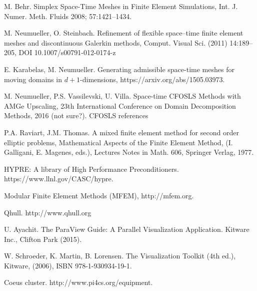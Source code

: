 \documentclass[12pt]{article}
\begin{document}

%


\begin{thebibliography}{100}

M. Behr. Simplex Space-Time Meshes in Finite Element Simulations,
Int. J. Numer. Meth. Fluids 2008; 57:1421–1434.

M. Neumueller, O. Steinbach. Refinement of flexible space–time finite element meshes and discontinuous Galerkin methods, Comput. Visual Sci. (2011) 14:189–205, DOI 10.1007/s00791-012-0174-z

E. Karabelas, M. Neumueller. Generating admissible space-time meshes for moving domains in $d + 1$-dimensions, https://arxiv.org/abs/1505.03973.

M. Neumueller, P.S. Vassilevski, U. Villa. Space-time CFOSLS Methods with AMGe Upscaling, 23th International Conference on Domain Decomposition Methods, 2016 (not sure?).
CFOSLS references

P.A. Raviart, J.M. Thomas. A mixed finite element method for second order elliptic problems, Mathematical Aspects of the Finite Element Method, (I. Galligani, E. Magenes, eds.), Lectures Notes in
Math. 606, Springer Verlag, 1977.

HYPRE: A library of High Performance Preconditioners. https://www.llnl.gov/CASC/hypre.

Modular Finite Element Methods (MFEM), http://mfem.org.

Qhull. http://www.qhull.org

U. Ayachit. The ParaView Guide: A Parallel Visualization Application. Kitware Inc., Clifton Park (2015).

W. Schroeder, K. Martin, B. Lorensen. The Visualization Toolkit (4th ed.), Kitware, (2006), ISBN 978-1-930934-19-1.

Coeus cluster. http://www.pi4cs.org/equipment.

\end{thebibliography}
\end{document}
